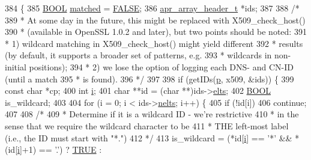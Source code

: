\begin{DoxyCode}
384 \{
385     \hyperlink{pcre__internal_8h_a050c65e107f0c828f856a231f4b4e788}{BOOL} \hyperlink{pcregrep_8txt_adbf62cf6c8d0bfcea6906e5ffb865b90}{matched} = \hyperlink{group__MOD__SSL__PRIVATE_gaa93f0eb578d23995850d61f7d61c55c1}{FALSE};
386     \hyperlink{structapr__array__header__t}{apr\_array\_header\_t} *ids;
387 
388     \textcolor{comment}{/*}
389 \textcolor{comment}{     * At some day in the future, this might be replaced with X509\_check\_host()}
390 \textcolor{comment}{     * (available in OpenSSL 1.0.2 and later), but two points should be noted:}
391 \textcolor{comment}{     * 1) wildcard matching in X509\_check\_host() might yield different}
392 \textcolor{comment}{     *    results (by default, it supports a broader set of patterns, e.g.}
393 \textcolor{comment}{     *    wildcards in non-initial positions);}
394 \textcolor{comment}{     * 2) we lose the option of logging each DNS- and CN-ID (until a match}
395 \textcolor{comment}{     *    is found).}
396 \textcolor{comment}{     */}
397 
398     \textcolor{keywordflow}{if} (getIDs(\hyperlink{group__APACHE__CORE__MPM_ga5cd91701e5c167f2b1a38e70ab57817e}{p}, x509, &ids)) \{
399         \textcolor{keyword}{const} \textcolor{keywordtype}{char} *cp;
400         \textcolor{keywordtype}{int} \hyperlink{group__MOD__PROXY_ga38403a0592eb8018a3ad61aef0f7ca2c}{i};
401         \textcolor{keywordtype}{char} **\textcolor{keywordtype}{id} = (\textcolor{keywordtype}{char} **)ids->\hyperlink{structapr__array__header__t_af8462fa2a1ddf6406c66cd3dd441a269}{elts};
402         \hyperlink{pcre__internal_8h_a050c65e107f0c828f856a231f4b4e788}{BOOL} is\_wildcard;
403 
404         for (i = 0; i < ids->\hyperlink{structapr__array__header__t_ab11b88220885c5a0920a06ac85680055}{nelts}; i++) \{
405             \textcolor{keywordflow}{if} (!\textcolor{keywordtype}{id}[i])
406                 \textcolor{keywordflow}{continue};
407 
408             \textcolor{comment}{/*}
409 \textcolor{comment}{             * Determine if it is a wildcard ID - we're restrictive}
410 \textcolor{comment}{             * in the sense that we require the wildcard character to be}
411 \textcolor{comment}{             * THE left-most label (i.e., the ID must start with "*.")}
412 \textcolor{comment}{             */}
413             is\_wildcard = (*\textcolor{keywordtype}{id}[\hyperlink{group__MOD__PROXY_ga38403a0592eb8018a3ad61aef0f7ca2c}{i}] == \textcolor{charliteral}{'*'} && *(\textcolor{keywordtype}{id}[\hyperlink{group__MOD__PROXY_ga38403a0592eb8018a3ad61aef0f7ca2c}{i}]+1) == \textcolor{charliteral}{'.'}) ? \hyperlink{group__MOD__SSL__PRIVATE_gaa8cecfc5c5c054d2875c03e77b7be15d}{TRUE} : 

\end{DoxyCode}
